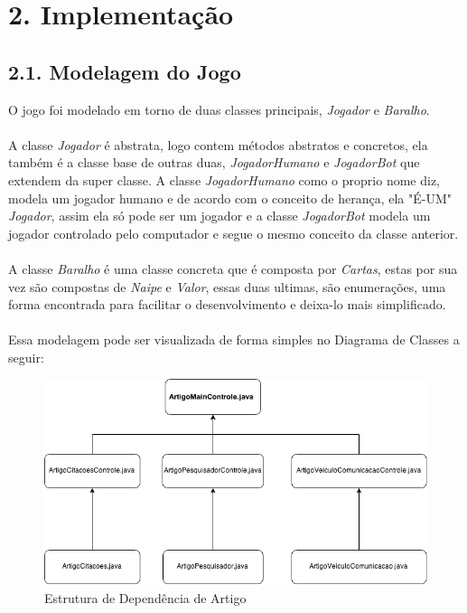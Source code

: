 \documentclass[12pt, a4paper]{article}
\begin{document}
\section*{2. Implementação}
  \subsection*{2.1. Modelagem do Jogo}
  O jogo foi modelado em torno de duas classes principais, \textit{Jogador} e \textit{Baralho}.
  \\\\
  A classe \textit{Jogador} é abstrata, logo contem métodos abstratos e concretos, ela também é a classe base de outras duas, \textit{JogadorHumano} e \textit{JogadorBot} que extendem da super classe. A classe \textit{JogadorHumano} como o proprio nome diz, modela um jogador humano e de acordo com o conceito de herança, ela "É-UM" \textit{Jogador}, assim ela só pode ser um jogador  e a classe \textit{JogadorBot} modela um jogador controlado pelo computador e segue o mesmo conceito da classe anterior.\\\\
  A classe \textit{Baralho} é uma classe concreta que é composta por \textit{Cartas}, estas por sua vez são compostas de \textit{Naipe} e \textit{Valor}, essas duas ultimas, são enumerações, uma forma encontrada para facilitar o desenvolvimento e deixa-lo mais simplificado.
  \\\\
  Essa modelagem pode ser visualizada de forma simples no Diagrama de Classes a seguir:

  \begin{figure}[!htb]
   \centering
   \includegraphics[scale=0.5]{Artigo}
   \caption{Estrutura de Dependência de Artigo}
   \label{Rotulo}
  \end{figure}
\end{document}

